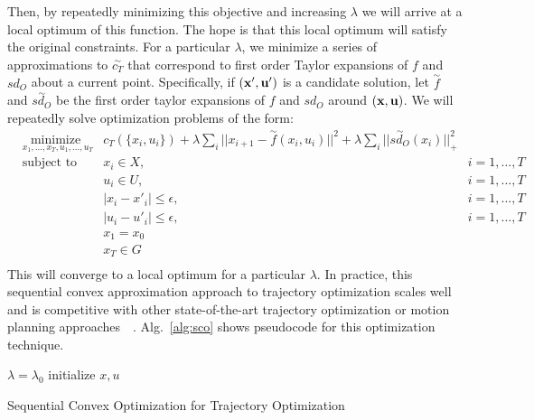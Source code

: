  Then, by repeatedly minimizing this objective and increasing $\lambda$ we will arrive at a local optimum of this function. The hope is that this local optimum will satisfy the original constraints. For a particular $\lambda$, we minimize a series of approximations to $\overset{\sim}{c_T}$ that correspond to first order Taylor expansions of $f$ and $sd_O$ about a current point. Specifically, if $(\bf{x'}, \bf{u'})$ is a candidate solution, let $\overset{\sim}{f}$ and $\overset{\sim}{sd_O}$ be the first order taylor expansions of $f$ and $sd_O$ around $(\bf{x}, \bf{u})$. We will repeatedly solve optimization problems of the form:
 \begin{equation}
 \begin{align}
 &\underset{x_1,\ldots, x_T, u_1,\ldots, u_T}{\text{minimize\ \ \ }} & c_T(\{x_i, u_i\}) + \lambda\sum_i ||x_{i+1} - \overset{\sim}{f}(x_i, u_i)||^2 + \lambda \sum_i ||\overset{\sim}{sd_O}(x_i)||^2_+ \\
 &\text{subject to\ \ \ }
 & x_i \in X , &i = 1,\ldots, T\\
 && u_i \in U , &i = 1,\ldots, T\\
  && |x_i - x'_i| \leq \epsilon, &i = 1,\ldots, T \\
 && |u_i - u'_i| \leq \epsilon, &i = 1,\ldots, T \\
 && x_1 = x_0 \\ && x_T \in G \\
\end{align}
\label{trajopt:sco}
\end{equation}
This will converge to a local optimum for a particular $\lambda$. In practice, this sequential convex approximation approach to trajectory optimization scales well and is competitive with other state-of-the-art trajectory optimization or motion planning approaches~\cite{schulman2013trajopt}~\cite{ratliff2009chomp}. Alg.~\ref{alg:sco} shows pseudocode for this optimization technique.

\begin{algorithm}[H]
 $\lambda = \lambda_0$\;
 initialize $x, u$\;
 
 \caption{Sequential Convex Optimization for Trajectory Optimization}
 \label{alg:sco}
\end{algorithm}
